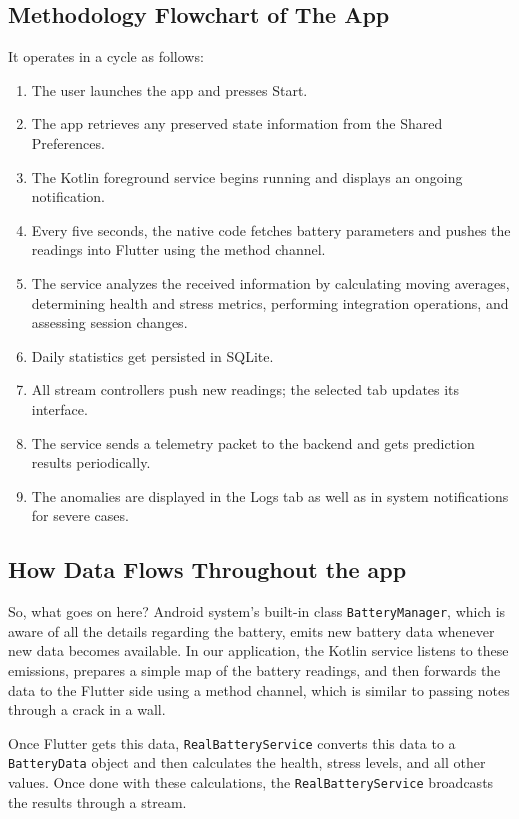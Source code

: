 \documentclass[12pt,a4paper]{report}
\begin{document}
\subsection{Methodology Flowchart of The App}

It operates in a cycle as follows:

\begin{enumerate}
  \item The user launches the app and presses Start.
  \item The app retrieves any preserved state information from the Shared Preferences.
  \item The Kotlin foreground service begins running and displays an ongoing notification.
  \item Every five seconds, the native code fetches battery parameters and pushes
        the readings into Flutter using the method channel.
  \item The service analyzes the received information by calculating moving
        averages, determining health and stress metrics, performing integration
        operations, and assessing session changes.
  \item Daily statistics get persisted in SQLite.
  \item All stream controllers push new readings; the selected tab updates its interface.
  \item The service sends a telemetry packet to the backend and gets prediction
        results periodically.
  \item The anomalies are displayed in the Logs tab as well as in system notifications
        for severe cases.
\end{enumerate}

\subsection{How Data Flows Throughout the app}

So, what goes on here? Android system's built-in class \texttt{BatteryManager}, which is aware of all the details regarding the battery, emits new battery data whenever new data becomes available. In our application, the Kotlin service listens to these emissions, prepares a simple map of the battery readings, and then forwards the data to the Flutter side using a method channel, which is similar to passing notes through a crack in a wall.

Once Flutter gets this data, \texttt{RealBatteryService} converts this data to a \texttt{BatteryData} object and then calculates the health, stress levels, and all other values. Once done with these calculations, the \texttt{RealBatteryService} broadcasts the results through a stream.
\end{document}
